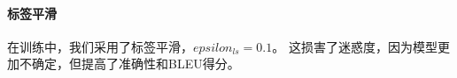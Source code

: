 



\paragraph{标签平滑} 在训练中，我们采用了标签平滑，$epsilon_{ls}=0.1$\citep{DBLP:journals/corr/SzegedyVISW15}。 这损害了迷惑度，因为模型更加不确定，但提高了准确性和BLEU得分。
